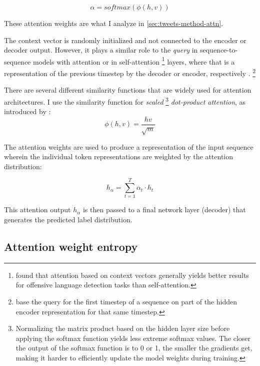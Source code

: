 \begin{equation}
    \alpha = softmax(\phi(h, v))
    \label{eq:alpha}
\end{equation}

These attention weights are what I analyze in \autoref{sec:tweets-method-attn}.

The context vector is randomly initialized and not connected to the encoder or decoder output.
However, it plays a similar role to the \textit{query} in sequence-to-sequence models with attention or in self-attention%
\footnote{\citet{chakrabarty2019pay} found that attention based on context vectors generally yields better results for offensive language detection tasks than self-attention.}
layers, where that is a representation of the previous timestep by the decoder or encoder, respectively \citep{bahdanau2014jointly,vaswani2017attention-all}.%
\footnote{\citet{bahdanau2014jointly} base the query for the first timestep of a sequence on part of the hidden encoder representation for that same timestep.}

There are several different similarity functions that are widely used for attention architectures.
I use the similarity function for \textit{scaled}%
\footnote{Normalizing the matrix product based on the hidden layer size before applying the softmax function yields less extreme softmax values.
The closer the output of the softmax function is to 0 or 1, the smaller the gradients get, making it harder to efficiently update the model weights during training.}
\textit{dot-product attention}, as introduced by \citet{vaswani2017attention-all}:
\begin{equation}
    \phi(h, v) = \frac{h v}{\sqrt{m}}
    \label{eq:phi}
\end{equation}

The attention weights are used to produce a representation of the input sequence wherein the individual token representations are weighted by the attention distribution:

\begin{equation}
    h_\alpha = \sum_{t=1}^T \alpha_t \cdot h_t
    \label{eq:halpha}
\end{equation}

This attention output $h_\alpha$ is then passed to a final network layer (decoder) that generates the predicted label distribution.


\subsection{Attention weight entropy}

